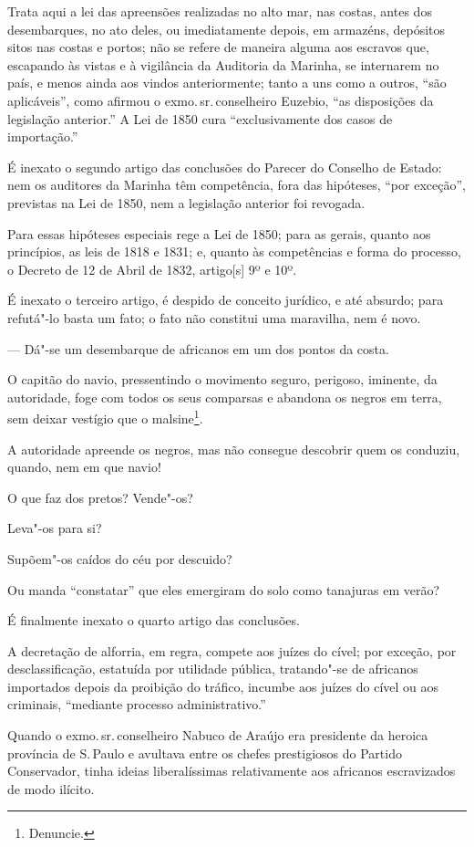 Trata aqui a lei das apreensões realizadas no alto mar, nas costas,
antes dos desembarques, no ato deles, ou imediatamente depois, em
armazéns, depósitos sitos nas costas e portos; não se refere de maneira
alguma aos escravos que, escapando às vistas e à vigilância da Auditoria
da Marinha, se internarem no país, e menos ainda aos vindos
anteriormente; tanto a uns como a outros, ``são aplicáveis'', como afirmou
o exmo.\,sr.\,conselheiro Euzebio, ``as disposições da legislação
anterior.'' A Lei de 1850 cura ``exclusivamente dos casos de importação.''

É inexato o segundo artigo das conclusões do Parecer do Conselho de
Estado: nem os auditores da Marinha têm competência, fora das hipóteses,
``por exceção'', previstas na Lei de 1850, nem a legislação anterior foi
revogada.

Para essas hipóteses especiais rege a Lei de 1850; para as gerais,
quanto aos princípios, as leis de 1818 e 1831; e, quanto às competências
e forma do processo, o Decreto de 12 de Abril de 1832, artigo{[}s{]} 9º
e 10º.

É inexato o terceiro artigo, é despido de conceito jurídico, e até
absurdo; para refutá"-lo basta um fato; o fato não constitui uma
maravilha, nem é novo.

--- Dá"-se um desembarque de africanos em um dos pontos da costa.

O capitão do navio, pressentindo o movimento seguro, perigoso, iminente,
da autoridade, foge com todos os seus comparsas e abandona os negros em
terra, sem deixar vestígio que o malsine\footnote{Denuncie.}.

A autoridade apreende os negros, mas não consegue descobrir quem os
conduziu, quando, nem em que navio!

O que faz dos pretos? Vende"-os?

Leva"-os para si?

Supõem"-os caídos do céu por descuido?

Ou manda ``constatar'' que eles emergiram do solo como tanajuras em verão?

É finalmente inexato o quarto artigo das conclusões.

A decretação de alforria, em regra, compete aos juízes do cível; por
exceção, por desclassificação, estatuída por utilidade pública,
tratando"-se de africanos importados depois da proibição do tráfico,
incumbe aos juízes do cível ou aos criminais, ``mediante processo
administrativo.''

Quando o exmo.\,sr.\,conselheiro Nabuco de Araújo era presidente da
heroica província de S.\,Paulo e avultava entre os chefes prestigiosos do
Partido Conservador, tinha ideias liberalíssimas relativamente aos
africanos escravizados de modo ilícito.

